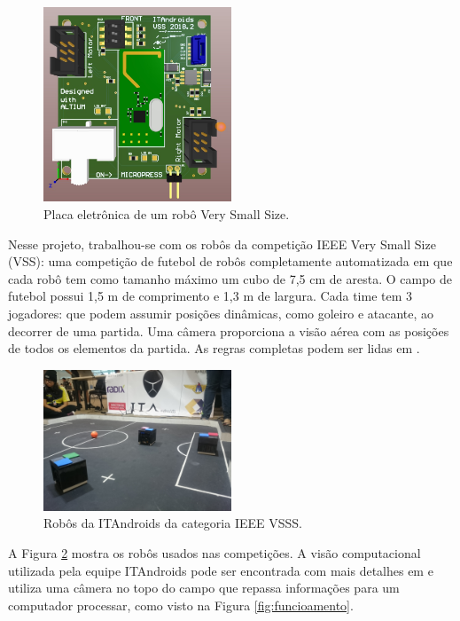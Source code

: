 \documentclass[a4paper,12pt]{article}
\begin{document}
\begin{figure}[H]
	\centering
	\includegraphics[width=0.5\textwidth]{figures/vss_ele.jpeg}
   \caption{Placa eletrônica de um robô Very Small Size.} \label{fig:vss_ele}
\end{figure}

Nesse projeto, trabalhou-se com os robôs da competição IEEE Very Small Size (VSS): uma competição de futebol de robôs completamente automatizada em que cada robô tem como tamanho máximo um cubo de 7,5 cm de aresta. O campo de futebol possui 1,5 m de comprimento e 1,3 m de largura. Cada time tem 3 jogadores: que podem assumir posições dinâmicas, como goleiro e atacante, ao decorrer de uma partida. Uma câmera proporciona a visão aérea com as posições de todos os elementos da partida. As regras completas podem ser lidas em \cite{cbr2008}.

\begin{figure}[H]
	\centering
	\includegraphics[width=0.5\textwidth]{figures/vss.JPG}
   \caption{Robôs da ITAndroids da categoria IEEE VSSS.} \label{fig:vss}
\end{figure}

A Figura \ref{fig:vss} mostra os robôs usados nas competições. A visão computacional utilizada pela equipe ITAndroids pode ser encontrada com mais detalhes em \cite{small_vision} e utiliza uma câmera no topo do campo que repassa informações para um computador processar, como visto na Figura \ref{fig:funcioamento}.
\end{document}

